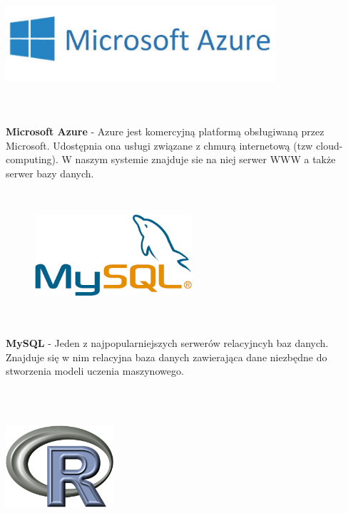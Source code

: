 \documentclass[licencjacka]{pracamgr}
\begin{document}
 \begin{minipage}{\linewidth}
            \centering
            \includegraphics[width=10cm, height = 3cm]{azure.jpg}
\end{minipage} \\ \\
\noindent 
 \textbf{Microsoft Azure} - Azure jest komercyjną platformą obsługiwaną przez Microsoft. Udostępnia ona usługi związane z chmurą internetową (tzw cloud-computing). W naszym systemie znajduje sie na niej serwer WWW a także serwer bazy danych. \par ~\\
\begin{minipage}{\linewidth}
            \centering
            \includegraphics[width=8cm, height = 3cm]{mysql.png}
\end{minipage} \\ \\

\noindent \textbf{MySQL} - Jeden z najpopularniejszych serwerów relacyjncyh baz danych. Znajduje się w nim relacyjna baza danych zawierająca dane niezbędne do stworzenia modeli uczenia maszynowego.  \par ~\\

\begin{minipage}{\linewidth}
            \centering
            \includegraphics[width=4cm, height = 4cm]{R.png}
\end{minipage} \\ \\
\end{document}
